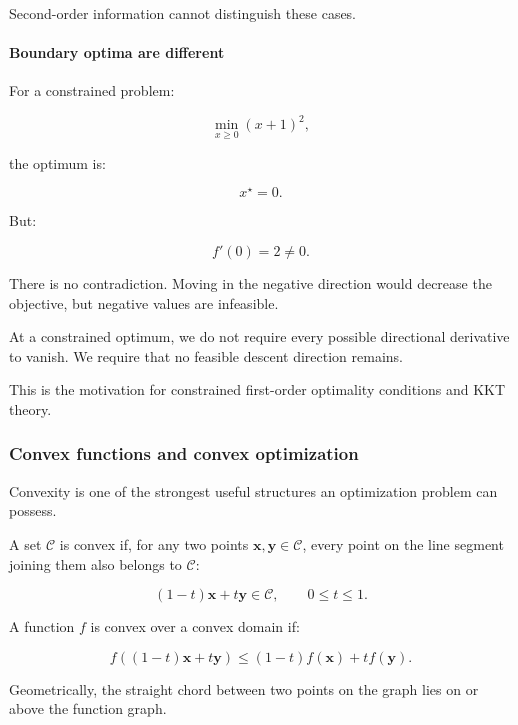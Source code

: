 Second-order information cannot distinguish these cases.

\paragraph{Boundary optima are different}\label{02-foundations-ii-ch026-boundary-optima-are-different}

\hypertarget{02-foundations-ii-ch026-boundary-optima-are-different}{}

For a constrained problem:

\[
\min_{x\ge0}(x+1)^2,
\]

the optimum is:

\[
x^\star=0.
\]

But:

\[
f'(0)=2\ne0.
\]

There is no contradiction. Moving in the negative direction would decrease the objective, but negative values are infeasible.

At a constrained optimum, we do not require every possible directional derivative to vanish. We require that no feasible descent direction remains.

This is the motivation for constrained first-order optimality conditions and KKT theory.

\subsubsection{Convex functions and convex optimization}\label{02-foundations-ii-ch026-convex-functions-and-convex-optimization}

\hypertarget{02-foundations-ii-ch026-convex-functions-and-convex-optimization}{}

Convexity is one of the strongest useful structures an optimization problem can possess.

A set \(\mathcal C\) is convex if, for any two points \(\mathbf x,\mathbf y\in\mathcal C\), every point on the line segment joining them also belongs to \(\mathcal C\):

\[
(1-t)\mathbf x+t\mathbf y\in\mathcal C, \qquad 0\le t\le1.
\]

A function \(f\) is convex over a convex domain if:

\[
\boxed{ f((1-t)\mathbf x+t\mathbf y) \le (1-t)f(\mathbf x)+tf(\mathbf y) }.
\]

Geometrically, the straight chord between two points on the graph lies on or above the function graph.

